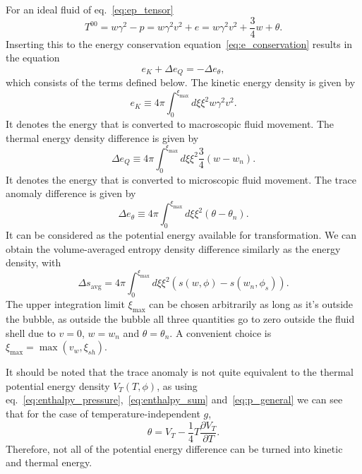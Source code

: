 For an ideal fluid of eq.~\eqref{eq:ep_tensor}~\cite[eq. B.23]{hindmarsh_gw_pt_2019}
\begin{equation}
T^{00} = w\gamma^2 - p = w\gamma^2 v^2 + e = w\gamma^2 v^2 + \frac{3}{4}w + \theta.
\end{equation}
Inserting this to the energy conservation equation~\eqref{eq:e_conservation}
results in the equation~\cite[eq. B.24]{hindmarsh_gw_pt_2019}
\begin{equation}
e_K + \Delta e_Q = - \Delta e_\theta,
\label{eq:energy_components}
\end{equation}
which consists of the terms defined below.
The kinetic energy density is given by
\begin{equation}
e_K \equiv 4 \pi \int_0^{\xi_\text{max}} d\xi \xi^2 w \gamma^2 v^2.
\label{eq:kinetic_energy_density}
\end{equation}
It denotes the energy that is converted to macroscopic fluid movement.
The thermal energy density difference is given by
\begin{equation}
\Delta e_Q \equiv 4 \pi \int_0^{\xi_\text{max}} d\xi \xi^2 \frac{3}{4} (w - w_n).
\label{eq:thermal_energy_density}
\end{equation}
It denotes the energy that is converted to microscopic fluid movement.
The trace anomaly difference is given by
\begin{equation}
\Delta e_\theta \equiv 4 \pi \int_0^{\xi_\text{max}} d\xi \xi^2 (\theta - \theta_n).
\end{equation}
It can be considered as the potential energy available for transformation.
We can obtain the volume-averaged entropy density difference similarly as the energy density, with
\begin{equation}
\Delta s_\text{avg} = 4\pi \int_0^{\xi_\text{max}} d\xi \xi^2 \left( s(w,\phi) - s(w_n, \phi_s) \right).
\end{equation}
The upper integration limit $\xi_\text{max}$ can be chosen arbitrarily as long as it's outside the bubble,
as outside the bubble all three quantities go to zero outside the fluid shell due to $v=0$, $w=w_n$ and $\theta = \theta_n$.
A convenient choice is $\xi_\text{max} = \max (v_w, \xi_{sh})$.
\cite[eq. B.25]{hindmarsh_gw_pt_2019}

It should be noted that the trace anomaly is not quite equivalent to the thermal potential energy density $V_T(T,\phi)$,
as using eq.~\eqref{eq:enthalpy_pressure},~\eqref{eq:enthalpy_sum} and~\eqref{eq:p_general}
we can see that for the case of temperature-independent $g$,
\begin{equation}
\theta = V_T - \frac{1}{4} T \frac{\partial V_T}{\partial T}.
\end{equation}
Therefore, not all of the potential energy difference can be turned into kinetic and thermal energy.
\cite[ch. B.2]{hindmarsh_gw_pt_2019}

